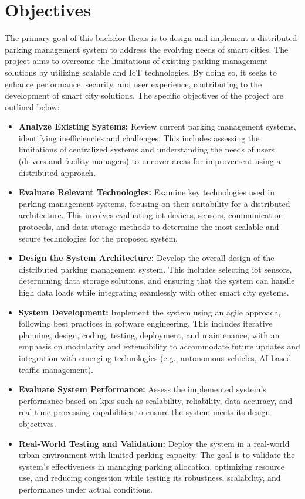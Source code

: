 
\chapter{Objectives}\label{ch:objectives}

The primary goal of this bachelor thesis is to design and implement a distributed parking management system to address the evolving needs of smart cities. The project aims to overcome the limitations of existing parking management solutions by utilizing scalable and \gls{IoT} technologies. By doing so, it seeks to enhance performance, security, and user experience, contributing to the development of smart city solutions. The specific objectives of the project are outlined below:

\begin{itemize}
	\item \textbf{Analyze Existing Systems:} Review current parking management systems, identifying inefficiencies and challenges. This includes assessing the limitations of centralized systems and understanding the needs of users (drivers and facility managers) to uncover areas for improvement using a distributed approach.

	\item \textbf{Evaluate Relevant Technologies:} Examine key technologies used in parking management systems, focusing on their suitability for a distributed architecture. This involves evaluating \gls{iot} devices, sensors, communication protocols, and data storage methods to determine the most scalable and secure technologies for the proposed system.

	\item \textbf{Design the System Architecture:} Develop the overall design of the distributed parking management system. This includes selecting \gls{iot} sensors, determining data storage solutions, and ensuring that the system can handle high data loads while integrating seamlessly with other smart city systems.

	\item \textbf{System Development:} Implement the system using an agile approach, following best practices in software engineering. This includes iterative planning, design, coding, testing, deployment, and maintenance, with an emphasis on modularity and extensibility to accommodate future updates and integration with emerging technologies (e.g., autonomous vehicles, AI-based traffic management).

	\item \textbf{Evaluate System Performance:} Assess the implemented system's performance based on \glspl{kpi} such as scalability, reliability, data accuracy, and real-time processing capabilities to ensure the system meets its design objectives.

	\item \textbf{Real-World Testing and Validation:} Deploy the system in a real-world urban environment with limited parking capacity. The goal is to validate the system’s effectiveness in managing parking allocation, optimizing resource use, and reducing congestion while testing its robustness, scalability, and performance under actual conditions.

\end{itemize}

